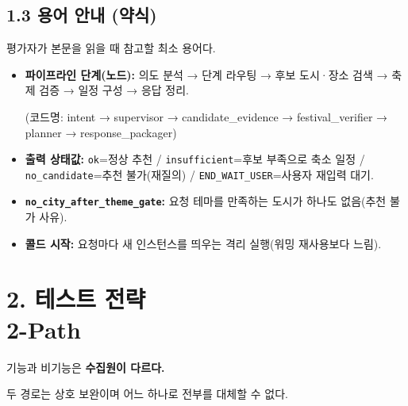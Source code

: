 \documentclass[12pt,a4paper]{article}
\newcommand{\DocNeedspace}[1]{\par\ifdim\dimexpr\pagegoal-\pagetotal\relax<#1\newpage\fi}
\providecommand{\tightlist}{\setlength{\itemsep}{0pt}\setlength{\parskip}{0pt}}
\newcommand{\SectionBreak}[2]{\texorpdfstring{#1\\[-0.10em]{\large #2}}{#1 #2}}
\begin{document}
\DocNeedspace{6\baselineskip}
\subsection*{1.3 용어 안내 (약식)}

평가자가 본문을 읽을 때 참고할 최소 용어다.

\begin{itemize}
\tightlist
\item
  \textbf{파이프라인 단계(노드):} 의도 분석 → 단계 라우팅 → 후보 도시·장소 검색 → 축제 검증 → 일정 구성 → 응답 정리.\par\noindent
  (코드명: intent → supervisor → candidate\_evidence → festival\_verifier → planner → response\_packager)
\item
  \textbf{출력 상태값:} \texttt{ok}=정상 추천 / \texttt{insufficient}=후보 부족으로 축소 일정 / \texttt{no\_\allowbreak{}candidate}=추천 불가(재질의) / \texttt{END\_\allowbreak{}WAIT\_\allowbreak{}USER}=사용자 재입력 대기.
\item
  \textbf{\texttt{no\_\allowbreak{}city\_\allowbreak{}after\_\allowbreak{}theme\_\allowbreak{}gate}:} 요청 테마를 만족하는 도시가 하나도 없음(추천 불가 사유).
\item
  \textbf{콜드 시작:} 요청마다 새 인스턴스를 띄우는 격리 실행(워밍 재사용보다 느림).
\end{itemize}

\newpage
\DocNeedspace{8\baselineskip}
\section*{\SectionBreak{2. 테스트 전략}{2-Path}}

기능과 비기능은 \textbf{수집원이 다르다.}
\par\noindent 두 경로는 상호 보완이며 어느 하나로 전부를 대체할 수 없다.
\end{document}
